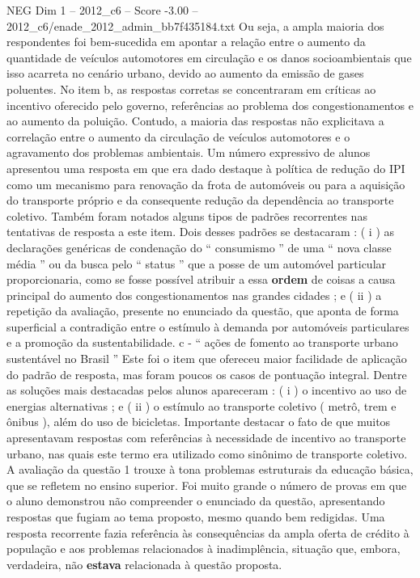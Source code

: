 \begin{textsample}{NEG Dim 1 – 2012\_c6 – Score -3.00 – 2012\_c6/enade\_2012\_admin\_bb7f435184.txt}
Ou seja, a ampla maioria dos respondentes foi bem-sucedida em apontar a relação entre o aumento da quantidade de veículos automotores em circulação e os danos socioambientais que isso acarreta no cenário urbano, devido ao aumento da emissão de gases poluentes.
No item b, as respostas corretas se concentraram em críticas ao incentivo oferecido pelo governo, referências ao problema dos congestionamentos e ao aumento da poluição.
Contudo, a maioria das respostas não explicitava a correlação entre o aumento da circulação de veículos automotores e o agravamento dos problemas ambientais.
Um número expressivo de alunos apresentou uma resposta em que era dado destaque à política de redução do IPI como um mecanismo para renovação da frota de automóveis ou para a aquisição do transporte próprio e da consequente redução da dependência ao transporte coletivo.
Também foram notados alguns tipos de padrões recorrentes nas tentativas de resposta a este item.
Dois desses padrões se destacaram : ( i ) as declarações genéricas de condenação do “ consumismo ” de uma “ nova classe média ” ou da busca pelo “ status ” que a posse de um automóvel particular proporcionaria, como se fosse possível atribuir a essa \textbf{ordem} de coisas a causa principal do aumento dos congestionamentos nas grandes cidades ; e ( ii ) a repetição da avaliação, presente no enunciado da questão, que aponta de forma superficial a contradição entre o estímulo à demanda por automóveis particulares e a promoção da sustentabilidade. c - “ ações de fomento ao transporte urbano sustentável no Brasil ” Este foi o item que ofereceu maior facilidade de aplicação do padrão de resposta, mas foram poucos os casos de pontuação integral.
Dentre as soluções mais destacadas pelos alunos apareceram : ( i ) o incentivo ao uso de energias alternativas ; e ( ii ) o estímulo ao transporte coletivo ( metrô, trem e ônibus ), além do uso de bicicletas.
Importante destacar o fato de que muitos apresentavam respostas com referências à necessidade de incentivo ao transporte urbano, nas quais este termo era utilizado como sinônimo de transporte coletivo.
A avaliação da questão 1 trouxe à tona problemas estruturais da educação básica, que se refletem no ensino superior.
Foi muito grande o número de provas em que o aluno demonstrou não compreender o enunciado da questão, apresentando respostas que fugiam ao tema proposto, mesmo quando bem redigidas.
Uma resposta recorrente fazia referência às consequências da ampla oferta de crédito à população e aos problemas relacionados à inadimplência, situação que, embora, verdadeira, não \textbf{estava} relacionada à questão proposta.

\end{textsample}
